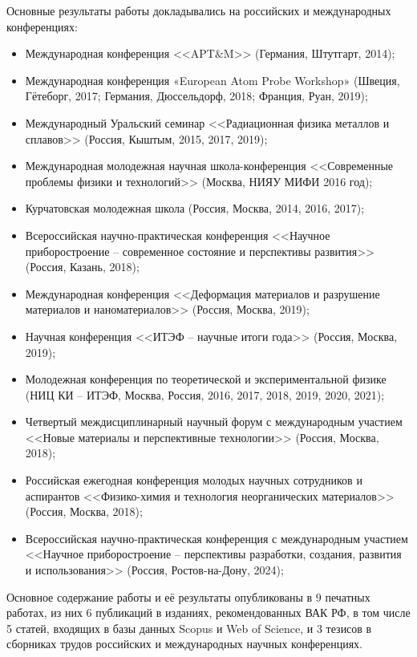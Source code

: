 {\probation}
Основные результаты работы докладывались на российских и международных конференциях:
\begin{itemize}
	\item Международная конференция <<APT$\&$M>> (Германия, Штутгарт, 2014);
	\item Международная конференция «European Atom Probe Workshop» (Швеция, Гётеборг, 2017; Германия, Дюссельдорф, 2018; Франция, Руан, 2019);
	\item Международный Уральский семинар <<Радиационная физика металлов и сплавов>> (Россия, Кыштым, 2015, 2017, 2019);
	\item Международная молодежная научная школа-конференция <<Современные проблемы физики и технологий>> (Москва, НИЯУ МИФИ 2016 год);
	\item Курчатовская молодежная школа (Россия, Москва, 2014, 2016, 2017);
	\item Всероссийская научно-практическая конференция <<Научное приборостроение – современное состояние и перспективы развития>> (Россия, Казань, 2018);	
	\item Международная конференция <<Деформация материалов и разрушение материалов и наноматериалов>> (Россия, Москва, 2019); 
	\item Научная конференция <<ИТЭФ – научные итоги года>> (Россия, Москва, 2019);
	\item Молодежная конференция по теоретической и экспериментальной физике (НИЦ КИ – ИТЭФ, Москва, Россия, 2016, 2017, 2018, 2019, 2020, 2021);
	\item Четвертый междисциплинарный научный форум с международным участием <<Новые материалы и перспективные технологии>> (Россия, Москва, 2018);
	\item Российская ежегодная конференция молодых научных сотрудников и аспирантов <<Физико-химия и технология неорганических материалов>> (Россия, Москва, 2018);
	\item Всероссийская научно-практическая конференция с международным участием <<Научное приборостроение – перспективы разработки, создания, развития и использования>> (Россия, Ростов-на-Дону, 2024);
	
\end{itemize}
Основное содержание работы и её результаты опубликованы в 9 печатных работах, из них 6 публикаций в изданиях, рекомендованных ВАК РФ, в том числе 5 статей, входящих в базы данных Scopus и Web of Science, и 3 тезисов в сборниках трудов российских и международных научных конференциях.

